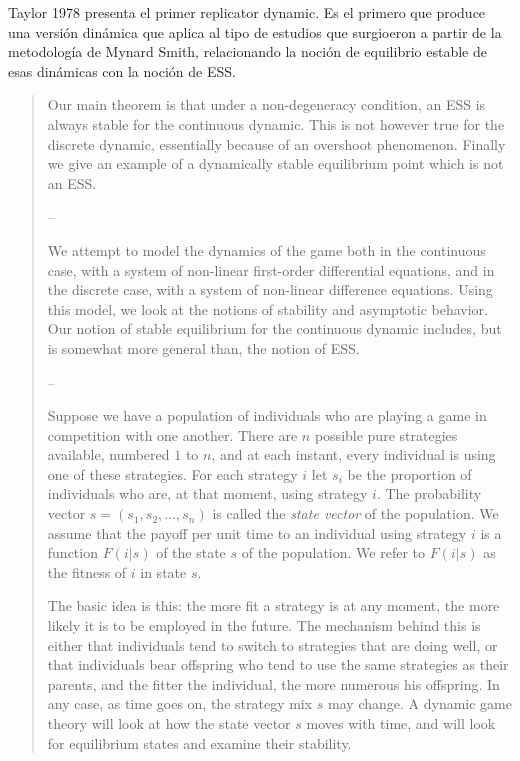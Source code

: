 \documentclass[a4paper,10pt]{article}
\begin{document}
Taylor 1978 presenta el primer replicator dynamic.
Es el primero que produce una versión dinámica que aplica al tipo de estudios que surgioeron a partir de la metodología de Mynard Smith, relacionando la noción de equilibrio estable de esas dinámicas con la noción de ESS. 
\begin{quotation} \cite{taylor1978-replicatorDynamic}
    
    Our main theorem is that under a non-degeneracy condition, an ESS is always stable for the continuous dynamic.
    This is not however true for the discrete dynamic, essentially because of an overshoot phenomenon.
    Finally we give an example of a dynamically stable equilibrium point which is not an ESS. 
    
    --
    
    We attempt to model the dynamics of the game both in the continuous case, with a system of non-linear first-order differential equations, and in the discrete case, with a system of non-linear difference equations.
    Using this model, we look at the notions of stability and asymptotic behavior.
    Our notion of stable equilibrium for the continuous dynamic includes, but is somewhat more general than, the notion of ESS.
    
    --
    
    Suppose we have a population of individuals who are playing a game in competition with one another.
    There are $n$ possible pure strategies available, numbered $1$ to $n$, and at each instant, every individual is using one of these strategies.
    For each strategy $i$ let $s_i$ be the proportion of individuals who are, at that moment, using strategy $i$.
    The probability vector $s=(s_1,s_2,\dots,s_n)$ is called the \emph{state vector} of the population.
    We assume that the payoff per unit time to an individual using strategy $i$ is a function $F(i|s)$ of the state $s$ of the population.
    We refer to $F(i|s)$ as the fitness of $i$ in state $s$.

    The basic idea is this: the more fit a strategy is at any moment, the more likely it is to be employed in the future. 
    The mechanism behind this is either that individuals tend to switch to strategies that are doing well, or that individuals bear offspring who tend to use the same strategies as their parents, and the fitter the individual, the more numerous his offspring.
    In any case, as time goes on, the strategy mix $s$ may change.
    A dynamic game theory will look at how the state vector $s$ moves with time, and will look for equilibrium states and examine their stability. 
    

\end{quotation}
\end{document}
